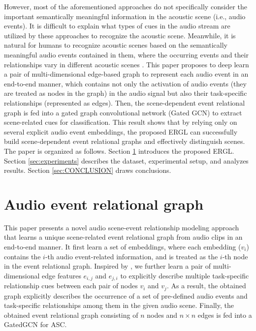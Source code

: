\documentclass{article}
\begin{document}
However, most of the aforementioned approaches do not specifically consider the important semantically meaningful information in the acoustic scene (i.e., audio events). 
It is difficult to explain what types of cues in the audio stream are utilized by these approaches to recognize the acoustic scene. 
Meanwhile, it is natural for humans to recognize acoustic scenes based on the semantically meaningful audio events contained in them, where the occurring events and their relationships vary in different acoustic scenes \cite{dick}. 
This paper proposes to deep learn a pair of multi-dimensional edge-based graph to represent each audio event in an end-to-end manner, which contains not only the activation of audio events (they are treated as nodes in the graph) in the audio signal but also their task-specific relationships (represented as edges).
Then, the scene-dependent event relational graph is fed into a gated graph convolutional network (Gated GCN) to extract scene-related cues for classification.
This result shows that by relying only on several explicit audio event embeddings, the proposed ERGL can successfully build scene-dependent event relational graphs and effectively distinguish scenes.
The paper is organized as follows. Section \ref{sec:format} introduces the proposed ERGL. Section \ref{sec:experiments} describes the dataset, experimental setup, and analyzes results. Section \ref{sec:CONCLUSION} draws conclusions.








\vspace{-0.3cm}
\section{Audio \textbf{e}vent \textbf{r}elational \textbf{g}raph}
\label{sec:format}



\vspace{-0.2cm}

This paper presents a novel audio scene-event relationship modeling approach that learns a unique scene-related event relational graph from audio clips in an end-to-end manner. It first learn a set of embeddings, where each embedding ($v_i$) contains the $i$-th audio event-related information, and is treated as the $i$-th node in the event relational graph. 
Inspired by \cite{luo2022learning,song2021learning}, we further learn a pair of multi-dimensional edge features $e_{i,j}$ and $e_{j,i}$  to explicitly describe multiple task-specific relationship cues between each pair of nodes $v_i$ and $v_j$. As a result, the obtained graph explicitly describes the occurrence of a set of pre-defined audio events
and task-specific relationships among them in the given audio scene. 
Finally, the obtained event relational graph consisting of $n$ nodes and $n\times n$ edges is fed into a GatedGCN \cite{gated_GCN} for ASC.
\end{document}
